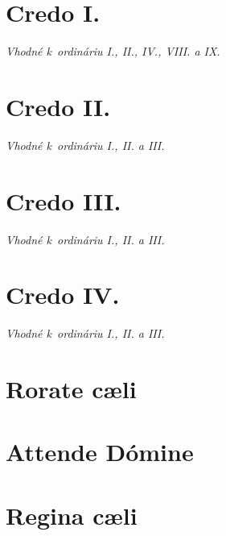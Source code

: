 \documentclass[12pt]{article} %
\newcommand{\info}[2]{{\textsc{#1}\hfill{\em #2}}\par\vspace{1em}}
\begin{document}

\section{Credo I.}
\info{}{Vhodné k~ordináriu I., II., IV., VIII. a IX.}




\section{Credo II.}
\info{}{Vhodné k~ordináriu I., II. a III.}




\section{Credo III.}
\info{}{Vhodné k~ordináriu I., II. a III.}




\section{Credo IV.}
\info{}{Vhodné k~ordináriu I., II. a III.}





\newpage

\section{Rorate c\ae{}li}


\section{Attende Dómine}


\section{Regina c\ae{}li}
\vspace{1em}

\end{document}
